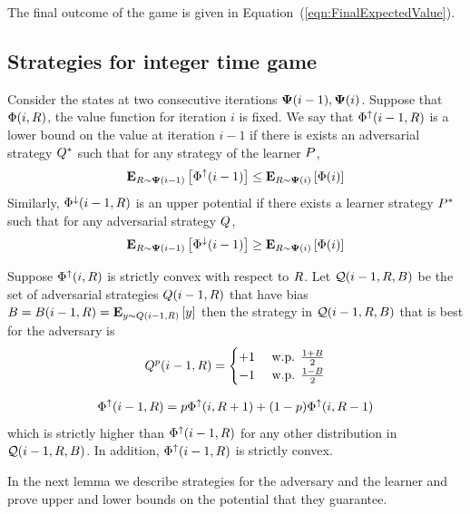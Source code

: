 \documentclass{article}[12pt]
\begin{document}
The final outcome of the game is given in
Equation~(\ref{eqn:FinalExpectedValue}).

\subsection{Strategies for integer time game}

Consider the states at two consecutive iterations ${\bf \Psi}(i-1),{\bf \Psi}(i)$.
Suppose that $\Phi(i,R)$, the value function for iteration $i$ is fixed.
We say that $\Phi^{\uparrow}(i-1,R)$ is a lower bound on the value at iteration
$i-1$ if there is exists an adversarial strategy $Q^*$ such that
for any strategy of the learner $P$, 
$$ {\bf E}_{R \sim {\bf \Psi}(i-1)}\left[ \Phi^{\uparrow}(i-1) \right] \leq {\bf E}_{R \sim {\bf \Psi}(i)}\left[ \Phi(i) \right]$$
Similarly, $\Phi^{\downarrow}(i-1,R)$ is an upper potential if there exists a
learner strategy $P^*$ such that for any adversarial strategy
$Q$,
$$ {\bf E}_{R \sim {\bf \Psi}(i-1)}\left[ \Phi^{\downarrow}(i-1) \right] \geq {\bf E}_{R \sim {\bf \Psi}(i)}\left[ \Phi(i) \right]$$


\begin{lemma} \label{lemma:adversary-prefers-extremes}
 Suppose $\Phi^{\uparrow}(i,R)$ is strictly convex with respect to  $R$.
Let ${\cal Q}(i-1,R,B)$ be the set of adversarial strategies 
$Q(i-1,R)$ that have bias
$B=B(i-1,R)= {\bf E}_{y \sim Q(i-1,R)}\left[ y \right]$ then the
strategy in ${\cal Q}(i-1,R,B)$ that is best for the adversary is
\begin{equation} \label{eqn:adv-strat-p}
  Q^p(i-1,R) =
  \begin{cases}
    +1 & \mbox{ w.p. } \frac{1+B}{2}\\
    -1 & \mbox{ w.p. } \frac{1-B}{2}\\
  \end{cases}
\end{equation}

\begin{equation} \label{eqn:value-iteration-lower}
  \Phi^{\uparrow}(i-1, R) = p \Phi^{\uparrow}(i,R+1) + (1-p)\Phi^{\uparrow}(i,R-1)
\end{equation}
which is strictly higher than $\Phi^{\uparrow}(i-1,R)$ for any other
distribution in ${\cal Q}(i-1,R,B)$. In addition,
$\Phi^{\uparrow}(i-1, R)$ is strictly convex.
\end{lemma}


In the next lemma we describe strategies for the adversary and the
learner and prove upper and lower bounds on the potential that they
guarantee.
\end{document}
